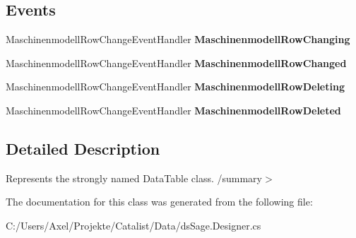 \subsection*{Events}
\begin{DoxyCompactItemize}
\item 
Maschinenmodell\+Row\+Change\+Event\+Handler {\bfseries Maschinenmodell\+Row\+Changing}\hypertarget{class_products_1_1_data_1_1ds_sage_1_1_maschinenmodell_data_table_ad3a8b211899205e4672df57e6f9b7a33}{}\label{class_products_1_1_data_1_1ds_sage_1_1_maschinenmodell_data_table_ad3a8b211899205e4672df57e6f9b7a33}

\item 
Maschinenmodell\+Row\+Change\+Event\+Handler {\bfseries Maschinenmodell\+Row\+Changed}\hypertarget{class_products_1_1_data_1_1ds_sage_1_1_maschinenmodell_data_table_a20b9a1646aa160fd6cbc9620683d236a}{}\label{class_products_1_1_data_1_1ds_sage_1_1_maschinenmodell_data_table_a20b9a1646aa160fd6cbc9620683d236a}

\item 
Maschinenmodell\+Row\+Change\+Event\+Handler {\bfseries Maschinenmodell\+Row\+Deleting}\hypertarget{class_products_1_1_data_1_1ds_sage_1_1_maschinenmodell_data_table_a6808125189e5789c8f6387de23b44f76}{}\label{class_products_1_1_data_1_1ds_sage_1_1_maschinenmodell_data_table_a6808125189e5789c8f6387de23b44f76}

\item 
Maschinenmodell\+Row\+Change\+Event\+Handler {\bfseries Maschinenmodell\+Row\+Deleted}\hypertarget{class_products_1_1_data_1_1ds_sage_1_1_maschinenmodell_data_table_acd3cab81264ab71c93420610a5d816b0}{}\label{class_products_1_1_data_1_1ds_sage_1_1_maschinenmodell_data_table_acd3cab81264ab71c93420610a5d816b0}

\end{DoxyCompactItemize}


\subsection{Detailed Description}
Represents the strongly named Data\+Table class. /summary$>$ 

The documentation for this class was generated from the following file\+:\begin{DoxyCompactItemize}
\item 
C\+:/\+Users/\+Axel/\+Projekte/\+Catalist/\+Data/ds\+Sage.\+Designer.\+cs\end{DoxyCompactItemize}

